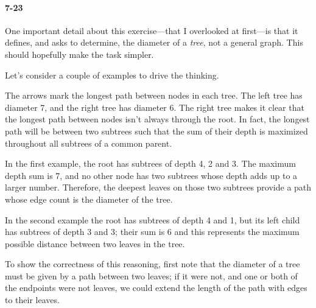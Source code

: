 \documentclass{report}
\begin{document}
\paragraph{7-23} One important detail about this exercise---that I overlooked at first---is that it defines, and asks to determine, the diameter of a \emph{tree}, not a general graph. This should hopefully make the task simpler.

Let's consider a couple of examples to drive the thinking.
\begin{center}
\hspace{.5cm}
\end{center}

The arrows mark the longest path between nodes in each tree. The left tree has diameter 7, and the right tree has diameter 6. The right tree makes it clear that the longest path between nodes isn't always through the root. In fact, the longest path will be between two subtrees such that the sum of their depth is maximized throughout all subtrees of a common parent.

In the first example, the root has subtrees of depth 4, 2 and 3. The maximum depth sum is 7, and no other node has two subtrees whose depth adds up to a larger number. Therefore, the deepest leaves on those two subtrees provide a path whose edge count is the diameter of the tree.

In the second example the root has subtrees of depth 4 and 1, but its left child has subtrees of depth 3 and 3; their sum is 6 and this represents the maximum possible distance between two leaves in the tree.

\smallskip

To show the correctness of this reasoning, first note that the diameter of a tree must be given by a path between two leaves; if it were not, and one or both of the endpoints were not leaves, we could extend the length of the path with edges to their leaves.
\end{document}
